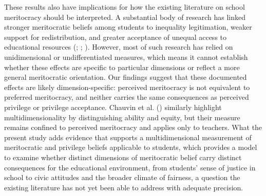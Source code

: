 \documentclass[
  13pt,
]{article}
\begin{document}
These results also have implications for how the existing literature on
school meritocracy should be interpreted. A substantial body of research
has linked stronger meritocratic beliefs among students to inequality
legitimation, weaker support for redistribution, and greater acceptance
of unequal access to educational resources
(;
;
).
However, most of such research has relied on unidimensional or
undifferentiated measures, which means it cannot establish whether these
effects are specific to particular dimensions or reflect a more general
meritocratic orientation. Our findings suggest that these documented
effects are likely dimension-specific: perceived meritocracy is not
equivalent to preferred meritocracy, and neither carries the same
consequences as perceived privilege or privilege acceptance. Chauvin et
al. () similarly highlight
multidimensionality by distinguishing ability and equity, but their
measure remains confined to perceived meritocracy and applies only to
teachers. What the present study adds evidence that supports a
multidimensional measurement of meritocratic and privilege beliefs
applicable to students, which provides a model to examine whether
distinct dimensions of meritocratic belief carry distinct consequences
for the educational environment, from students' sense of justice in
school to civic attitudes and the broader climate of fairness, a
question the existing literature has not yet been able to address with
adequate precision.
\end{document}
